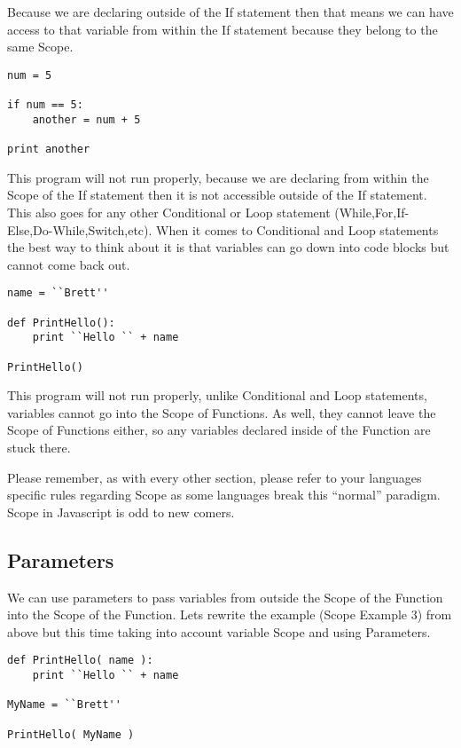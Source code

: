 Because we are declaring  outside of the If statement then that means we can have access to that variable from
within the If statement because they belong to the same Scope.

\begin{lstlisting}[caption={Scope Example 2}]
num = 5

if num == 5:
    another = num + 5

print another
\end{lstlisting}

This program will not run properly, because we are declaring  from within the Scope of the If statement
then it is not accessible outside of the If statement.
This also goes for any other Conditional or Loop statement (While,For,If-Else,Do-While,Switch,etc).
When it comes to Conditional and Loop statements the best way to think about it is that variables can go down into
code blocks but cannot come back out.
\par

\begin{lstlisting}[caption={Scope Example 3}]
name = ``Brett''

def PrintHello():
    print ``Hello `` + name

PrintHello()
\end{lstlisting}

This program will not run properly, unlike Conditional and Loop statements, variables cannot go into the Scope of Functions.
As well, they cannot leave the Scope of Functions either, so any variables declared inside of the Function are stuck there.
\par

Please remember, as with every other section, please refer to your languages specific rules regarding Scope as some languages break
this ``normal'' paradigm.
Scope in Javascript is odd to new comers.

\subsection{Parameters}
We can use parameters to pass variables from outside the Scope of the Function into the Scope of the Function.
Lets rewrite the example (Scope Example 3) from above but this time taking into account variable Scope and using Parameters.

\begin{lstlisting}[caption={PrintHello Parameter Example}]
def PrintHello( name ):
    print ``Hello `` + name

MyName = ``Brett''

PrintHello( MyName )
\end{lstlisting}

